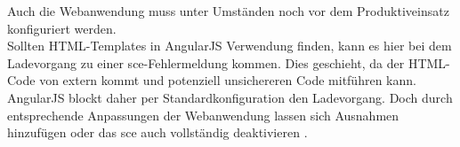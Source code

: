 \label{sec:anpassen-der-webanwendung}
Auch die Webanwendung muss unter Umständen noch vor dem Produktiveinsatz konfiguriert werden. \\
Sollten HTML-Templates in AngularJS Verwendung finden, kann es hier bei dem Ladevorgang zu einer \ac{sce}-Fehlermeldung kommen. Dies geschieht, da der HTML-Code von extern kommt und potenziell unsichereren Code mitführen kann. AngularJS blockt daher per Standardkonfiguration den Ladevorgang. Doch durch entsprechende Anpassungen der Webanwendung lassen sich Ausnahmen hinzufügen oder das \ac{sce} auch vollständig deaktivieren \cite{Google2016d}.
